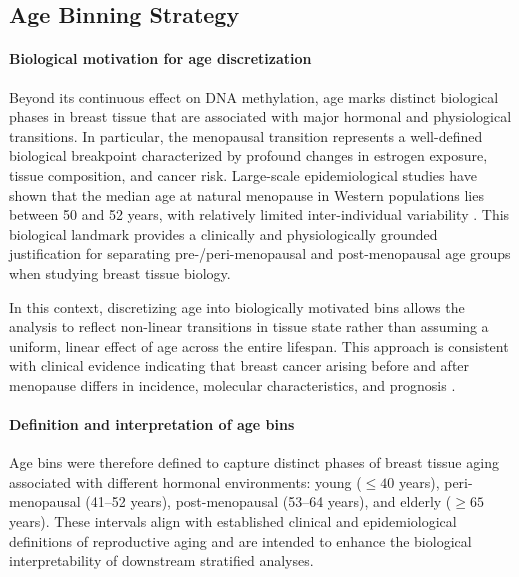 \documentclass[10pt]{extarticle}
\begin{document}
\subsection{Age Binning Strategy}

\paragraph{Biological motivation for age discretization}
Beyond its continuous effect on DNA methylation, age marks distinct biological phases in breast tissue that are associated with major hormonal and physiological transitions. In particular, the menopausal transition represents a well-defined biological breakpoint characterized by profound changes in estrogen exposure, tissue composition, and cancer risk. Large-scale epidemiological studies have shown that the median age at natural menopause in Western populations lies between 50 and 52 years, with relatively limited inter-individual variability \cite{Gold2013}. This biological landmark provides a clinically and physiologically grounded justification for separating pre-/peri-menopausal and post-menopausal age groups when studying breast tissue biology.

In this context, discretizing age into biologically motivated bins allows the analysis to reflect non-linear transitions in tissue state rather than assuming a uniform, linear effect of age across the entire lifespan. This approach is consistent with clinical evidence indicating that breast cancer arising before and after menopause differs in incidence, molecular characteristics, and prognosis \cite{Azim2012}.

\paragraph{Definition and interpretation of age bins}
Age bins were therefore defined to capture distinct phases of breast tissue aging associated with different hormonal environments: young ($\leq 40$ years), peri-menopausal (41--52 years), post-menopausal (53--64 years), and elderly ($\geq 65$ years). These intervals align with established clinical and epidemiological definitions of reproductive aging and are intended to enhance the biological interpretability of downstream stratified analyses. 
\end{document}
